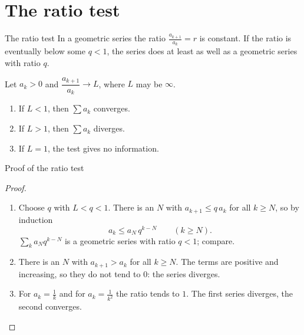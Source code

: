 \documentclass{wosm-slides}
\begin{document}
\section{The ratio test}

\begin{frame}{The ratio test}
  In a geometric series the ratio $\frac{a_{k+1}}{a_k} = r$ is constant.
  If the ratio is eventually below some $q < 1$, the series does at least as well as
  a geometric series with ratio $q$.
  \begin{theorem}
    Let $a_k > 0$ and $\dfrac{a_{k+1}}{a_k} \to L$, where $L$ may be $\infty$.
    \begin{enumerate}
      \item If $L < 1$, then $\sum a_k$ converges.
      \item If $L > 1$, then $\sum a_k$ diverges.
      \item If $L = 1$, the test gives no information.
    \end{enumerate}
  \end{theorem}
\end{frame}

\begin{frame}{Proof of the ratio test}
  \begin{proof}
    \begin{enumerate}
      \item Choose $q$ with $L < q < 1$. There is an $N$ with $a_{k+1} \le q\, a_k$ for all
        $k \ge N$, so by induction
        \[ a_k \le a_N\, q^{k-N} \qquad (k \ge N) . \]
        $\sum_k a_N q^{k-N}$ is a geometric series with ratio $q < 1$; compare.
      \item There is an $N$ with $a_{k+1} > a_k$ for all $k \ge N$. The terms are positive
        and increasing, so they do not tend to $0$: the series diverges.
      \item For $a_k = \frac1k$ and for $a_k = \frac{1}{k^2}$ the ratio tends to $1$.
        The first series diverges, the second converges. \qedhere
    \end{enumerate}
  \end{proof}
\end{frame}
\end{document}
